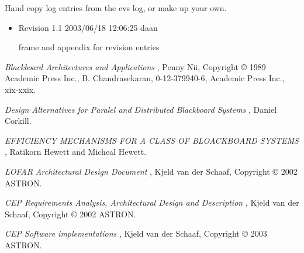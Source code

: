 \documentclass[]{lofar}
\begin{document}
  \label{app:revisionLog}\hypertarget{app:revisionLog}{}%

    Hand copy log entries from the cvs log, or make up your own.

    \begin{itemize}

      \item 

        Revision 1.1 2003/06/18 12:06:25 daan

        frame and appendix for revision entries

    \end{itemize}

  
  \begin{thebibliography}{WIDELABEL}

      \emph{Blackboard Architectures and Applications} ,
      Penny Nii,
      Copyright \copyright{} 1989 Academic Press Inc.,
      B. Chandrasekaran,
      0-12-379940-6,
      Academic Press Inc.,
      xix-xxix.
      \label{bib:nii}

      \emph{Design Alternatives for Paralel and Distributed Blackboard Systems} ,
      Daniel Corkill.
      \label{bib:Design-Alternatives}

      \emph{EFFICIENCY MECHANISMS FOR A CLASS OF BLOACKBOARD SYSTEMS} ,
      Ratikorn Hewett and Micheal Hewett.
      \label{bib:Efficiency}

      \emph{LOFAR Architectural Design Document} ,
      Kjeld van der Schaaf,
      Copyright \copyright{} 2002 ASTRON.
      \label{bib:LOFAR-ASTRON-ADD-006}

      \emph{CEP Requirements Analysis, Architectural Design and
      Description} ,
      Kjeld van der Schaaf,
      Copyright \copyright{} 2002 ASTRON.
      \label{bib:LOFAR-ASTRON-MEM-035}

      \emph{CEP Software implementations} ,
      Kjeld van der Schaaf,
      Copyright \copyright{} 2003 ASTRON.
      \label{bib:PDR-CEP-Software}

  \end{thebibliography}

\end{document}
